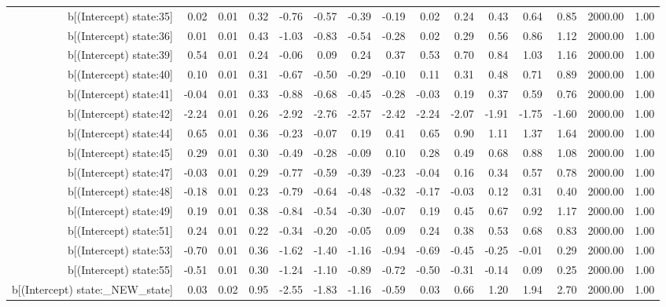\begin{table}[ht]
\begin{tabular}{rrrrrrrrrrrrrrr}
  b[(Intercept) state:35] & 0.02 & 0.01 & 0.32 & -0.76 & -0.57 & -0.39 & -0.19 & 0.02 & 0.24 & 0.43 & 0.64 & 0.85 & 2000.00 & 1.00 \\ 
  b[(Intercept) state:36] & 0.01 & 0.01 & 0.43 & -1.03 & -0.83 & -0.54 & -0.28 & 0.02 & 0.29 & 0.56 & 0.86 & 1.12 & 2000.00 & 1.00 \\ 
  b[(Intercept) state:39] & 0.54 & 0.01 & 0.24 & -0.06 & 0.09 & 0.24 & 0.37 & 0.53 & 0.70 & 0.84 & 1.03 & 1.16 & 2000.00 & 1.00 \\ 
  b[(Intercept) state:40] & 0.10 & 0.01 & 0.31 & -0.67 & -0.50 & -0.29 & -0.10 & 0.11 & 0.31 & 0.48 & 0.71 & 0.89 & 2000.00 & 1.00 \\ 
  b[(Intercept) state:41] & -0.04 & 0.01 & 0.33 & -0.88 & -0.68 & -0.45 & -0.28 & -0.03 & 0.19 & 0.37 & 0.59 & 0.76 & 2000.00 & 1.00 \\ 
  b[(Intercept) state:42] & -2.24 & 0.01 & 0.26 & -2.92 & -2.76 & -2.57 & -2.42 & -2.24 & -2.07 & -1.91 & -1.75 & -1.60 & 2000.00 & 1.00 \\ 
  b[(Intercept) state:44] & 0.65 & 0.01 & 0.36 & -0.23 & -0.07 & 0.19 & 0.41 & 0.65 & 0.90 & 1.11 & 1.37 & 1.64 & 2000.00 & 1.00 \\ 
  b[(Intercept) state:45] & 0.29 & 0.01 & 0.30 & -0.49 & -0.28 & -0.09 & 0.10 & 0.28 & 0.49 & 0.68 & 0.88 & 1.08 & 2000.00 & 1.00 \\ 
  b[(Intercept) state:47] & -0.03 & 0.01 & 0.29 & -0.77 & -0.59 & -0.39 & -0.23 & -0.04 & 0.16 & 0.34 & 0.57 & 0.78 & 2000.00 & 1.00 \\ 
  b[(Intercept) state:48] & -0.18 & 0.01 & 0.23 & -0.79 & -0.64 & -0.48 & -0.32 & -0.17 & -0.03 & 0.12 & 0.31 & 0.40 & 2000.00 & 1.00 \\ 
  b[(Intercept) state:49] & 0.19 & 0.01 & 0.38 & -0.84 & -0.54 & -0.30 & -0.07 & 0.19 & 0.45 & 0.67 & 0.92 & 1.17 & 2000.00 & 1.00 \\ 
  b[(Intercept) state:51] & 0.24 & 0.01 & 0.22 & -0.34 & -0.20 & -0.05 & 0.09 & 0.24 & 0.38 & 0.53 & 0.68 & 0.83 & 2000.00 & 1.00 \\ 
  b[(Intercept) state:53] & -0.70 & 0.01 & 0.36 & -1.62 & -1.40 & -1.16 & -0.94 & -0.69 & -0.45 & -0.25 & -0.01 & 0.29 & 2000.00 & 1.00 \\ 
  b[(Intercept) state:55] & -0.51 & 0.01 & 0.30 & -1.24 & -1.10 & -0.89 & -0.72 & -0.50 & -0.31 & -0.14 & 0.09 & 0.25 & 2000.00 & 1.00 \\ 
  b[(Intercept) state:\_NEW\_state] & 0.03 & 0.02 & 0.95 & -2.55 & -1.83 & -1.16 & -0.59 & 0.03 & 0.66 & 1.20 & 1.94 & 2.70 & 2000.00 & 1.00 \\ 

\end{tabular}
\end{table}
